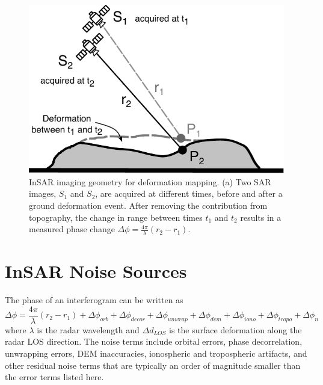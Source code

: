 \begin{figure}
	\centering
	\includegraphics[width=0.9\linewidth]{figures/chapter3-sar/ch3-insar-geometry-defo.pdf}
	\caption[InSAR imaging geometry for deformation mapping]{InSAR imaging geometry for deformation mapping.
		(a) Two SAR images, $S_1$ and $S_2$, are acquired at different times, before and after a ground deformation event. After removing the contribution from topography, the change in range between times $t_1$ and $t_2$ results in a measured phase change $\Delta \phi =  \frac{4 \pi}{\lambda}(r_2 - r_1)$.
	}
	\label{fig:ch3-insar-geometry-defo}
\end{figure}

\section{InSAR Noise Sources}
\label{sec:ch3-noise}
%
The phase of an interferogram can be written as
\citep{Zebker1992DecorrelationInterferometricRadar, Zebker1994AccuracyTopographicMaps, Zebker1997AtmosphericEffectsInterferometric}
\begin{equation}
	\Delta \phi = \frac{4 \pi}{\lambda} (r_2 - r_1) +  \Delta \phi_{orb} + \Delta \phi_{decor} + \Delta \phi_{unwrap}  + \Delta \phi_{dem} + \Delta \phi_{iono} + \Delta \phi_{tropo}  + \Delta \phi_{n}
\end{equation}
where $ \lambda $ is the radar wavelength and $ \Delta d_{LOS} $ is the surface deformation along the radar LOS direction. The noise terms include orbital errors, phase decorrelation, unwrapping errors, DEM inaccuracies, ionospheric and tropospheric artifacts, and other residual noise terms that are typically an order of magnitude smaller than the error terms listed here.



